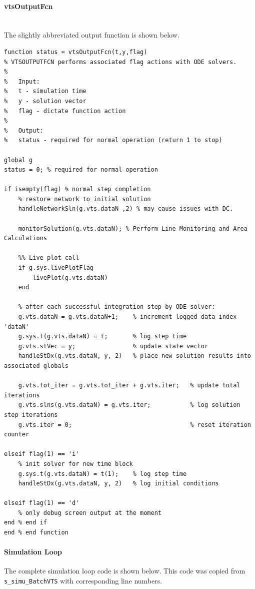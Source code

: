 \documentclass[12pt]{article}
\begin{document}
\paragraph{vtsOutputFcn} \ \\
The slightly abbreviated output function is shown below.
\begin{verbatim}
function status = vtsOutputFcn(t,y,flag)
% VTSOUTPUTFCN performs associated flag actions with ODE solvers.
%
%   Input:
%   t - simulation time
%   y - solution vector
%   flag - dictate function action
%
%   Output:
%   status - required for normal operation (return 1 to stop)

global g 
status = 0; % required for normal operation

if isempty(flag) % normal step completion
    % restore network to initial solution
    handleNetworkSln(g.vts.dataN ,2) % may cause issues with DC.
    
    monitorSolution(g.vts.dataN); % Perform Line Monitoring and Area Calculations 
    
    %% Live plot call
    if g.sys.livePlotFlag
        livePlot(g.vts.dataN)
    end
    
    % after each successful integration step by ODE solver:
    g.vts.dataN = g.vts.dataN+1;    % increment logged data index 'dataN'
    g.sys.t(g.vts.dataN) = t;       % log step time
    g.vts.stVec = y;                % update state vector
    handleStDx(g.vts.dataN, y, 2)   % place new solution results into associated globals
    
    g.vts.tot_iter = g.vts.tot_iter + g.vts.iter;   % update total iterations
    g.vts.slns(g.vts.dataN) = g.vts.iter;           % log solution step iterations
    g.vts.iter = 0;                                 % reset iteration counter
    
elseif flag(1) == 'i' 
    % init solver for new time block
    g.sys.t(g.vts.dataN) = t(1);    % log step time
    handleStDx(g.vts.dataN, y, 2)   % log initial conditions
  
elseif flag(1) == 'd'
    % only debug screen output at the moment
end % end if
end % end function
\end{verbatim}

\pagebreak
\paragraph{Simulation Loop}
The complete simulation loop code is shown below.
This code was copied from \verb|s_simu_BatchVTS| with corresponding line numbers.
\end{document}

